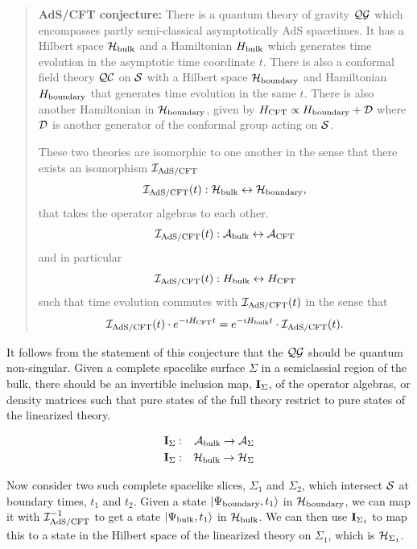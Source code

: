 \documentclass[12pt]{article}
\newcommand{\fa}{\begin{eqnarray}}
\newcommand{\ffa}{\end{eqnarray}}
\newcommand{\f}{\begin{equation}}
\newcommand{\ff}{\end{equation}}
\begin{document}
\begin{quotation}

{\bf AdS/CFT conjecture:}  There is a quantum theory of gravity ${\cal Q}{\cal G}$ which encompasses partly semi-classical asymptotically AdS spacetimes.  It has a Hilbert space ${\cal H}_{{\rm bulk}}$ and a Hamiltonian $H_{{\rm bulk}}$ which generates time evolution in the asymptotic
time coordinate $t$.  There is also a conformal field theory ${\cal Q}{\cal C}$ on $\cal S$ with a Hilbert space
${\cal H}_{{\rm boundary}}$ and Hamiltonian $H_{{\rm boundary}}$ that generates time evolution in the same $t$.  There is also another Hamiltonian in ${\cal H}_{{\rm boundary}}$, given by $H_{{\rm CFT}} \propto H_{{\rm boundary}} + {\cal D}$ where ${\cal D}$ is another generator of the conformal group acting on $\cal S$.  

These two theories are isomorphic to one another in the sense that there exists an  isomorphism ${\cal I}_{{\rm AdS/CFT}}$
\f
{\cal I}_{{\rm AdS/CFT}}(t) : {\cal H}_{{\rm bulk}} \leftrightarrow  {\cal H}_{{\rm boundary}} ,  
\ff
that takes the operator algebras to each other.
\f
{\cal I}_{{\rm AdS/CFT}}(t) :   {\cal A}_{{\rm bulk}} \leftrightarrow {\cal A}_{{\rm CFT}}
\ff
and in particular
\f
{\cal I}_{{\rm AdS/CFT}}(t) :   H_{{\rm bulk}} \leftrightarrow H_{{\rm CFT}}
\ff
such that time evolution commutes with ${\cal I}_{{\rm AdS/CFT}}(t)$ in the sense that
\f
{\cal I}_{{\rm AdS/CFT}}(t) \cdot e^{-\imath H_{{\rm CFT}} t } = e^{-\imath H_{{\rm bulk}} t }  \cdot {\cal I}_{{\rm AdS/CFT}}(t) . 
\ff

\end{quotation}


It follows from the statement of this conjecture that the ${\cal Q}{\cal G}$ should be quantum non-singular.  Given a complete spacelike surface $\Sigma$ in a semiclassial region of the bulk,  there should be an invertible 
inclusion map, ${\bf I}_\Sigma $, of the operator algebras, or density matrices such that pure states of the full theory restrict to pure states of the linearized theory.  

\fa
{\bf I}_\Sigma &:& {\cal A}_{\rm bulk} \rightarrow {\cal A}_{\Sigma}\\
{\bf I}_\Sigma &:& {\cal H}_{\rm bulk }  \rightarrow { \cal H}_{\Sigma}
\ffa


Now consider two such complete spacelike slices, $\Sigma_1$ and $\Sigma_2$, which intersect $\cal S$ at boundary times, 
$t_1$ and $t_2$.  Given a state $| \Psi_{\rm boundary}, t_1 \rangle$ in ${\cal H}_{\rm boundary}$,  we can map it with ${\cal I}_{{\rm AdS/CFT}}^{-1}$
to get a state $| \Psi_{\rm bulk}, t_1 \rangle$ in ${\cal H}_{{\rm bulk}}$.  
We can then use  $ {\bf I}_{\Sigma_1}$  to map this to a state in the Hilbert space of the linearized theory on $\Sigma_1 $, 
which is ${ \cal H}_{\Sigma_1}$.  
\end{document}
